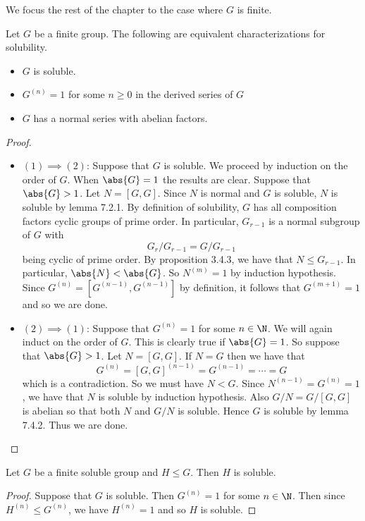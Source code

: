 \documentclass[a4paper]{article}
\begin{document}
We focus the rest of the chapter to the case where $G$ is finite. 

\begin{thm}{}{} Let $G$ be a finite group. The following are equivalent characterizations for solubility. 
\begin{itemize}
\item $G$ is soluble. 
\item $G^{(n)}=1$ for some $n\geq 0$ in the derived series of $G$
\item $G$ has a normal series with abelian factors. 
\end{itemize} \tcbline
\begin{proof}~\\
\begin{itemize}
\item $(1)\implies(2)$: Suppose that $G$ is soluble. We proceed by induction on the order of $G$. When $\abs{G}=1$ the results are clear. Suppose that $\abs{G}>1$. Let $N=[G,G]$. Since $N$ is normal and $G$ is soluble, $N$ is soluble by lemma 7.2.1. By definition of solubility, $G$ has all composition factors cyclic groups of prime order. In particular, $G_{r-1}$ is a normal subgroup of $G$ with $$G_r/G_{r-1}=G/G_{r-1}$$ being cyclic of prime order. By proposition 3.4.3, we have that $N\leq G_{r-1}$. In particular, $\abs{N}<\abs{G}$. So $N^{(m)}=1$ by induction hypothesis. Since $G^{(n)}=[G^{(n-1)},G^{(n-1)}]$ by definition, it follows that $G^{(m+1)}=1$ and so we are done. 
\item $(2)\implies(1)$: Suppose that $G^{(n)}=1$ for some $n\in\N$. We will again induct on the order of $G$. This is clearly true if $\abs{G}=1$. So suppose that $\abs{G}>1$. Let $N=[G,G]$. If $N=G$ then we have that $$G^{(n)}=[G,G]^{(n-1)}=G^{(n-1)}=\cdots=G$$ which is a contradiction. So we must have $N<G$. Since $N^{(n-1)}=G^{(n)}=1$, we have that $N$ is soluble by induction hypothesis. Also $G/N=G/[G,G]$ is abelian so that both $N$ and $G/N$ is soluble. Hence $G$ is soluble by lemma 7.4.2. Thus we are done. 
\end{itemize}
\end{proof}
\end{thm}

\begin{crl}{}{} Let $G$ be a finite soluble group and $H\leq G$. Then $H$ is soluble. \tcbline
\begin{proof}
Suppose that $G$ is soluble. Then $G^{(n)}=1$ for some $n\in\N$. Then since $H^{(n)}\leq G^{(n)}$, we have $H^{(n)}=1$ and so $H$ is soluble. 
\end{proof}
\end{crl}
\end{document}
